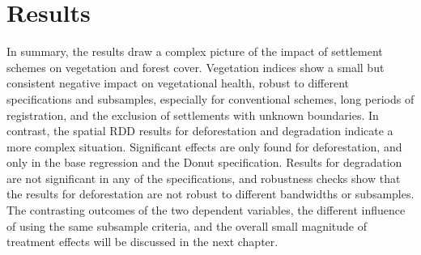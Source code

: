 \section{Results}
\label{sec:results}





In summary, the results draw a complex picture of the impact of settlement schemes on vegetation and forest cover.
Vegetation indices show a small but consistent negative impact on vegetational health, robust to different specifications and subsamples,
especially for conventional schemes, long periods of registration, and the exclusion of settlements with unknown boundaries.
In contrast, the spatial RDD results for deforestation and degradation indicate a more complex situation.
Significant effects are only found for deforestation, and only in the base regression and the Donut specification.
Results for degradation are not significant in any of the specifications, and robustness checks show that the results for deforestation are not robust to different bandwidths or subsamples.
The contrasting outcomes of the two dependent variables, the different influence of using the same subsample criteria,
and the overall small magnitude of treatment effects will be discussed in the next chapter.